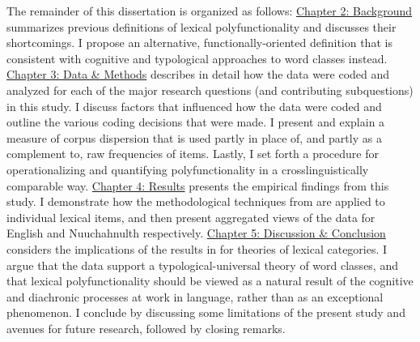 The remainder of this dissertation is organized as follows: \hyperref[ch:background]{Chapter 2: Background} summarizes previous definitions of lexical polyfunctionality and discusses their shortcomings. I propose an alternative, functionally-oriented definition that is consistent with cognitive and typological approaches to word classes instead. \hyperref[ch:background]{Chapter 3: Data \& Methods} describes in detail how the data were coded and analyzed for each of the major research questions (and contributing subquestions) in this study. I discuss factors that influenced how the data were coded and outline the various coding decisions that were made. I present and explain a measure of corpus dispersion that is used partly in place of, and partly as a complement to, raw frequencies of items. Lastly, I set forth a procedure for operationalizing and quantifying polyfunctionality in a crosslinguistically comparable way. \hyperref[ch:background]{Chapter 4: Results} presents the empirical findings from this study. I demonstrate how the methodological techniques from  are applied to individual lexical items, and then present aggregated views of the data for English and Nuuchahnulth respectively. \hyperref[ch:background]{Chapter 5: Discussion \& Conclusion} considers the implications of the results in  for theories of lexical categories. I argue that the data support a typological-universal theory of word classes, and that lexical polyfunctionality should be viewed as a natural result of the cognitive and diachronic processes at work in language, rather than as an exceptional phenomenon. I conclude by discussing some limitations of the present study and avenues for future research, followed by closing remarks.
